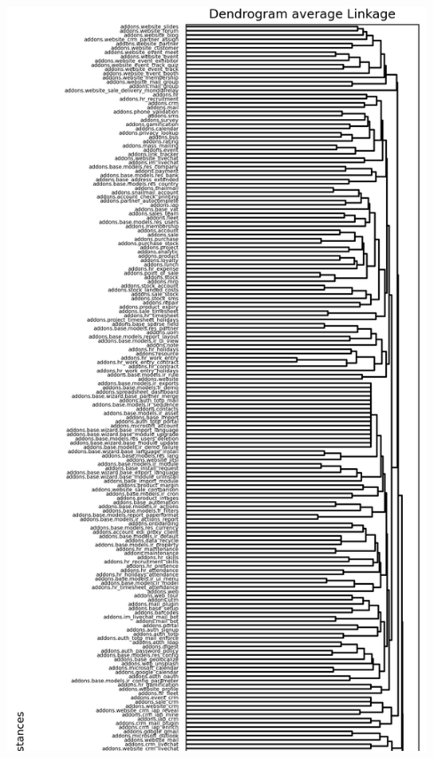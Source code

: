 \begin{center}
  \includegraphics[width=12.5cm]{img/lampiran/average-full-1.png}
  \label{fig:average-full-1}
\end{center}
\pagebreak
